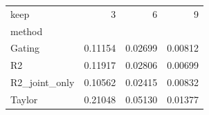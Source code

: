 \begin{tabular}{lrrr}
\toprule
keep & 3 & 6 & 9 \\
method &  &  &  \\
\midrule
Gating & 0.11154 & 0.02699 & 0.00812 \\
R2 & 0.11917 & 0.02806 & 0.00699 \\
R2_joint_only & 0.10562 & 0.02415 & 0.00832 \\
Taylor & 0.21048 & 0.05130 & 0.01377 \\
\bottomrule
\end{tabular}
